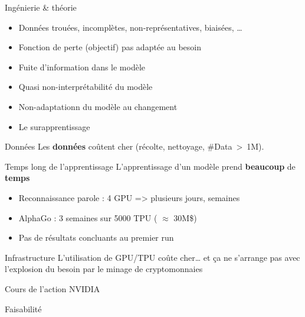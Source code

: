 \begin{frame}{Ingénierie \& théorie}
  \begin{itemize}[<+->]
    \item Données trouées, incomplètes, non-représentatives, biaisées, …
    \item Fonction de perte (objectif) pas adaptée au besoin
    \item Fuite d'information dans le modèle
    \item Quasi non-interprétabilité du modèle
    \item Non-adaptationn du modèle au changement
    \item Le surapprentissage
  \end{itemize}
\end{frame}

\begin{frame}{Données}
  Les \textbf{données} coûtent cher (récolte, nettoyage, \#Data~>~1M). 
\end{frame}

\begin{frame}{Temps long de l'apprentissage}
  L'apprentissage d'un modèle prend \textbf{beaucoup} de \textbf{temps}
  \begin{itemize}[<+->]
    \item Reconnaissance parole : 4 GPU => plusieurs jours, semaines
    \item AlphaGo : 3 semaines sur 5000 TPU ( $\approx$ 30M\$)
    \item Pas de résultats concluants au premier run
  \end{itemize}
\end{frame}

\begin{frame}{Infrastructure}
  L'utilisation de GPU/TPU coûte cher… et ça ne s'arrange pas avec l'explosion du besoin par le minage de cryptomonnaies
  \begin{center}
    \small Cours de l'action NVIDIA
  \end{center}
\end{frame}

\begin{frame}{Faisabilité}
\end{frame}

